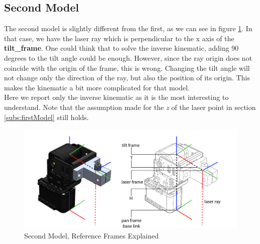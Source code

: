 \subsection{Second Model} \label{subs:secondModel}
The second model is slightly different from the first, as we can see in figure \ref{fig:secondModelRefFrame}. In that case, we have the laser ray which is perpendicular to the x axis of the \textbf{tilt\_frame}. One could think that to solve the inverse kinematic, adding 90 degrees to the tilt angle could be enough. However, since the ray origin does not coincide with the origin of the frame, this is wrong. Changing the tilt angle will not change only the direction of the ray, but also the position of its origin. This makes the kinematic a bit more complicated for that model.
\\
Here we report only the inverse kinematic as it is the most interesting to understand. Note that the assumption made for the \textit{z} of the laser point in section \ref{subs:firstModel} still holds.

\begin{figure}
	\centering
	\includegraphics[width=\textwidth]{img/model2Ref.png}%
	\caption{Second Model, Reference Frames Explained}
	\label{fig:secondModelRefFrame}
\end{figure}

